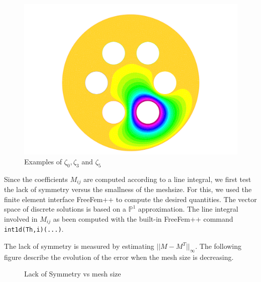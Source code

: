 \begin{figure}[!h]
  \includegraphics[scale=0.20]{figures/sol_5.pdf}
  \caption{Examples of $\zeta_0,\zeta_3$ and $\zeta_5$}
\label{fig:zetafamily}
\end{figure}


Since the coefficients $M_{ij}$ are computed according to a line integral, we
first test the lack of symmetry versus the smallness  of the
meshsize. For this, we used the finite element interface FreeFem++ to compute
the desired quantities. The vector space of discrete solutions is based on a
$\mathbb{P}^1$ approximation. The line integral involved in $M_{ij}$ as been
computed with the built-in FreeFem++ command \texttt{int1d(Th,i)(...)}. 

The lack of symmetry is measured by estimating $|| M-M^T ||_\infty$. The
following figure describe the evolution of the error when the mesh size is
decreasing.
\begin{figure}[h]
  \centering
  \caption{Lack of Symmetry vs mesh size}
\label{fig:symm}
\end{figure}


